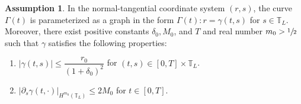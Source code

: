 \documentclass[10pt]{amsart}
\newenvironment{enumeratei}
{\bgroup\def\theenumi{\roman{enumi}}\def\theenumii{\arabic{enumii}}\begin{enumerate}}
{\end{enumerate}\egroup}
\newcommand{\itGamma}{\mathit{\Gamma}}
\theoremstyle{definition}
\newtheorem{assumption}[theorem]{Assumption}
\begin{document}
\begin{assumption}\label{ass:CL}
In the normal-tangential coordinate system $(r,s)$,
the curve $\itGamma(t)$ is parameterized as a graph in the form $\itGamma(t): r=\gamma(t,s)$ for $s\in\mathbb{T}_L$.
Moreover, there exist positive constants $\delta_0,M_0$, and $T$ and real number $m_0>\sfrac12$ such that $\gamma$ satisfies the following properties:
\begin{enumeratei}
\item\label{ass:CLi}
$|\gamma(t,s)| \leq \dfrac{r_0}{(1+\delta_0)^2}$ for $(t,s)\in[0,T]\times\mathbb{T}_L$.

\item\label{ass:CLii}
$|\partial_s\gamma(t,\cdot)|_{H^{m_0}(\mathbb{T}_L)} \leq 2 M_0$ for $t\in[0,T]$.
\end{enumeratei}
\end{assumption}
\end{document}

